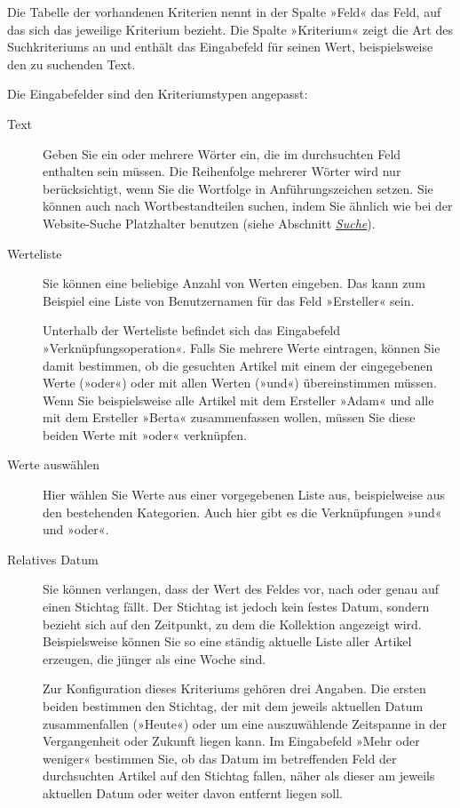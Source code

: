\documentclass[a4paper,12pt,ngerman]{manual}
\begin{document}
Die Tabelle der vorhandenen Kriterien nennt in der Spalte »Feld« das Feld,
auf das sich das jeweilige Kriterium bezieht. Die Spalte »Kriterium« zeigt
die Art des Suchkriteriums an und enthält das Eingabefeld für seinen Wert,
beispielsweise den zu suchenden Text.

Die Eingabefelder sind den Kriteriumstypen angepasst:
\begin{description}
\item[Text] \leavevmode
Geben Sie ein oder mehrere Wörter ein, die im durchsuchten Feld
enthalten sein müssen. Die Reihenfolge mehrerer Wörter wird nur
berücksichtigt, wenn Sie die Wortfolge in Anführungszeichen setzen. Sie
können auch nach
Wortbestandteilen suchen, indem Sie ähnlich wie bei der Website-Suche
Platzhalter benutzen (siehe Abschnitt \hyperlink{sec-suche}{\emph{Suche}}).

\item[Werteliste] \leavevmode
Sie können eine beliebige Anzahl von Werten eingeben. Das
kann zum Beispiel eine Liste von Benutzernamen für das Feld »Ersteller«
sein.

Unterhalb der Werteliste befindet sich das Eingabefeld
»Verknüpfungsoperation«. Falls Sie mehrere Werte eintragen, können Sie damit
bestimmen, ob die gesuchten Artikel mit einem der eingegebenen Werte
(»oder«) oder mit allen Werten (»und«) übereinstimmen müssen. Wenn Sie
beispielsweise alle Artikel mit dem Ersteller »Adam« und alle mit dem
Ersteller »Berta« zusammenfassen wollen, müssen Sie diese beiden Werte mit
»oder« verknüpfen.

\item[Werte auswählen] \leavevmode
Hier wählen Sie Werte aus einer vorgegebenen Liste aus,
beispielweise aus den bestehenden Kategorien. Auch hier gibt es die
Verknüpfungen »und« und »oder«.

\item[Relatives Datum] \leavevmode
Sie können verlangen, dass der Wert des Feldes vor,
nach oder genau auf einen Stichtag fällt. Der Stichtag ist jedoch kein
festes Datum, sondern bezieht sich auf den Zeitpunkt, zu dem
die Kollektion angezeigt wird. Beispielsweise können Sie so eine ständig
aktuelle Liste aller Artikel erzeugen, die jünger als eine Woche sind.

Zur Konfiguration dieses Kriteriums gehören drei Angaben. Die ersten beiden
bestimmen den Stichtag, der mit dem jeweils aktuellen Datum zusammenfallen
(»Heute«) oder um eine auszuwählende Zeitspanne in der Vergangenheit oder
Zukunft liegen kann. Im Eingabefeld »Mehr oder weniger« bestimmen Sie, ob
das Datum im betreffenden Feld der durchsuchten Artikel auf den Stichtag
fallen, näher als dieser am jeweils aktuellen Datum oder weiter davon
entfernt liegen soll.


\end{description}
\end{document}

